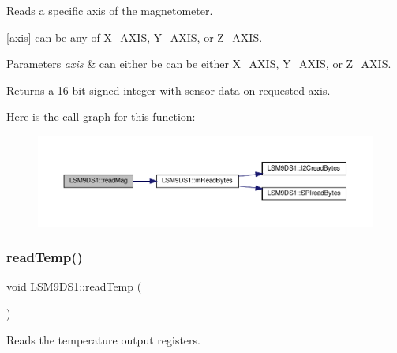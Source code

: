 Reads a specific axis of the magnetometer. 

\mbox{[}axis\mbox{]} can be any of X\+\_\+\+A\+X\+IS, Y\+\_\+\+A\+X\+IS, or Z\+\_\+\+A\+X\+IS.


\begin{DoxyParams}{Parameters}
{\em axis} & can either be can be either X\+\_\+\+A\+X\+IS, Y\+\_\+\+A\+X\+IS, or Z\+\_\+\+A\+X\+IS. \\
\hline
\end{DoxyParams}
\begin{DoxyReturn}{Returns}
a 16-\/bit signed integer with sensor data on requested axis. 
\end{DoxyReturn}
Here is the call graph for this function\+:\nopagebreak
\begin{figure}[H]
\begin{center}
\leavevmode
\includegraphics[width=350pt]{classLSM9DS1_a615fd3ab32a9af833ef9899663100330_cgraph}
\end{center}
\end{figure}
\mbox{\label{classLSM9DS1_aca21a51dc79a1287b97ed9c326e2080b}} 
\subsubsection{\texorpdfstring{read\+Temp()}{readTemp()}}
{\footnotesize\ttfamily void L\+S\+M9\+D\+S1\+::read\+Temp (\begin{DoxyParamCaption}{ }\end{DoxyParamCaption})}



Reads the temperature output registers. 

